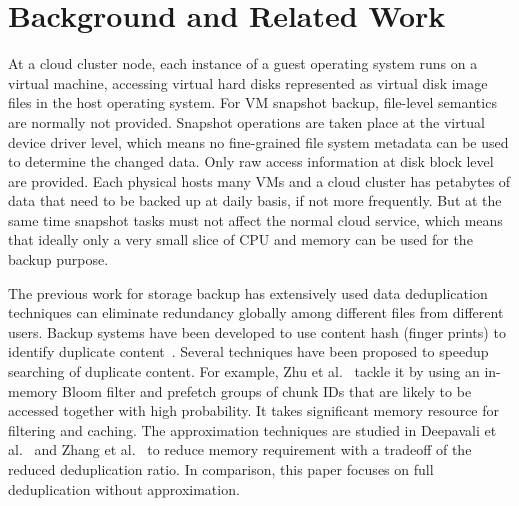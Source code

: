 
\section{Background and Related Work}
\label{sect:background}




At a cloud cluster node, each instance of a guest operating system runs on a virtual machine, accessing virtual hard disks 
represented as virtual disk image files in the host operating system.
For VM snapshot backup, file-level semantics are normally not provided.
Snapshot operations are taken place at the virtual device driver level, which means no fine-grained file system metadata can be used to determine the changed data. Only raw access information at disk block level are provided. 
Each physical hosts many VMs and a cloud cluster has  petabytes of data that need to be backed up at daily basis, 
if not more frequently. But at the same time snapshot tasks must not affect the normal cloud service, 
which means that ideally only a very small slice of CPU and memory can be used for the backup purpose.


The previous work for storage backup has extensively used  data deduplication techniques can eliminate redundancy globally among different files from different users.
Backup systems have been developed to use content hash (finger prints) to identify duplicate
content~\cite{venti02,Rhea2008}.
Several techniques have been proposed to speedup searching of duplicate
content. For example,
Zhu et al.~\cite{bottleneck08} tackle it
by using an in-memory Bloom filter and prefetch groups of chunk IDs that are likely to be
accessed together with high probability. It takes significant memory resource for filtering and caching.
The approximation techniques are studied in Deepavali et al.~\cite{extreme_binning09} and
Zhang et al.~\cite{WeiZhangIEEE}  to reduce memory requirement with a tradeoff of the reduced deduplication ratio.
In comparison, this paper focuses on  full deduplication without approximation.

